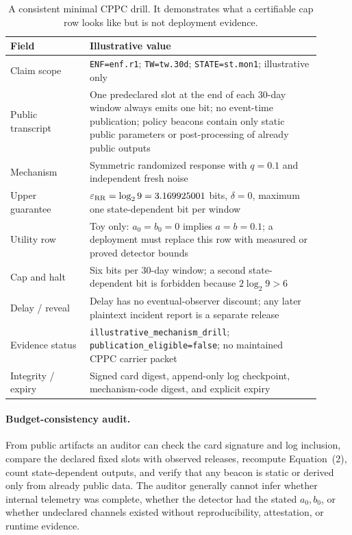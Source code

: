 \documentclass[11pt]{article}
\begin{document}
\begin{table}[t]
\centering\small
\begin{tabular}{@{}p{0.23\linewidth}p{0.67\linewidth}@{}}
\toprule
Field & Illustrative value \\
\midrule
Claim scope & \texttt{ENF=enf.r1}; \texttt{TW=tw.30d}; \texttt{STATE=st.mon1}; illustrative only \\
Public transcript & One predeclared slot at the end of each 30-day window always emits one bit; no event-time publication; policy beacons contain only static public parameters or post-processing of already public outputs \\
Mechanism & Symmetric randomized response with $q=0.1$ and independent fresh noise \\
Upper guarantee & $\varepsilon_{\rm RR}=\log_2 9=3.169925001$ bits, $\delta=0$, maximum one state-dependent bit per window \\
Utility row & Toy only: $a_0=b_0=0$ implies $a=b=0.1$; a deployment must replace this row with measured or proved detector bounds \\
Cap and halt & Six bits per 30-day window; a second state-dependent bit is forbidden because $2\log_2 9>6$ \\
Delay / reveal & Delay has no eventual-observer discount; any later plaintext incident report is a separate release \\
Evidence status & \texttt{illustrative\_mechanism\_drill}; \texttt{publication\_eligible=false}; no maintained CPPC carrier packet \\
Integrity / expiry & Signed card digest, append-only log checkpoint, mechanism-code digest, and explicit expiry \\
\bottomrule
\end{tabular}
\caption{A consistent minimal CPPC drill.  It demonstrates what a certifiable cap row looks like but is not deployment evidence.}
\label{tab:card}
\end{table}

\paragraph{Budget-consistency audit.}
From public artifacts an auditor can check the card signature and log inclusion, compare the declared fixed slots with observed releases, recompute Equation~(2), count state-dependent outputs, and verify that any beacon is static or derived only from already public data.
The auditor generally cannot infer whether internal telemetry was complete, whether the detector had the stated $a_0,b_0$, or whether undeclared channels existed without reproducibility, attestation, or runtime evidence.\cite{series:evalnotary,series:opB,rfc9162_ct,newman2022sigstore}
\end{document}
